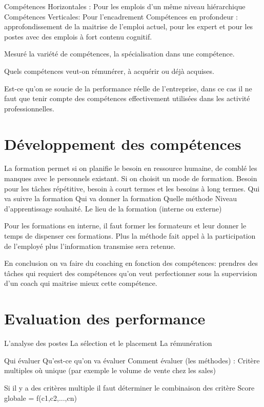 Compétences Horizontales : Pour les emplois d'un même niveau hiérarchique
Compétences Verticales: Pour l'encadrement
Compétences en profondeur : approfondissement de la maitrise de l'emploi actuel, pour les expert et pour les postes avec des emplois à fort contenu cognitif. 


Mesuré la variété de compétences, la spécialisation dans une compétence. 


Quels compétences veut-on rémunérer, à acquérir ou déjà acquises.

Est-ce qu'on se soucie de la performance réelle de l'entreprise, dans ce cas il ne faut que tenir compte des compétences effectivement utilisées dans les activité professionnelles. 



\section{Développement des compétences } \cite{gestionressourceshumaine2002}
La formation permet si on planifie le besoin en ressource humaine, de comblé les manques avec le personnels existant. 
Si on choisit un mode de formation.
Besoin pour les tâches répétitive, besoin à court termes et les besoins à long termes. 
Qui va suivre la formation
Qui va donner la formation 
Quelle méthode
Niveau d'apprentissage souhaité.
Le lieu de la formation (interne ou externe)

Pour les formations en interne, il faut former les formateurs et leur donner le temps de dispenser ces formations. 
Plus la méthode fait appel à la participation de l'employé plus l'information transmise sera retenue.

En conclusion on va faire du coaching en fonction des compétences: prendres des tâches qui requiert des compétences qu'on veut perfectionner sous la supervision d'un coach qui maitrise mieux cette compétence. 


\section{Evaluation des performance}
L'analyse des postes
La sélection et le placement 
La rémunération


Qui évaluer 
Qu'est-ce qu'on va évaluer
Comment évaluer (les méthodes) : Critère multiples où unique (par exemple le volume de vente chez les sales) 

Si il y a des critères multiple il faut déterminer le combinaison des critère
Score globale = f(c1,c2,...,cn)

